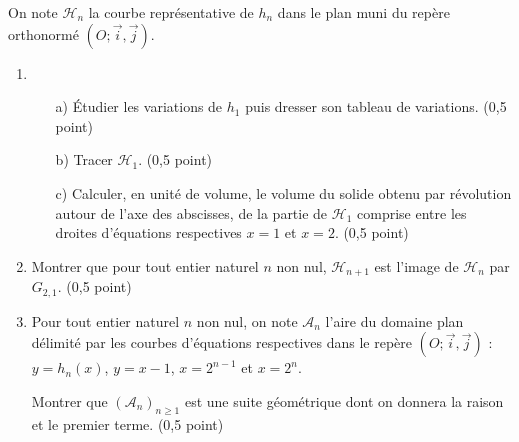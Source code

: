 \documentclass[11pt]{article}
\begin{document}
On note \( \mathcal{H}_n \) la courbe représentative de \( h_n \) dans le plan muni du repère orthonormé \( (O ; \vec{i}, \vec{j}) \).

\begin{enumerate}
    \item
    \begin{enumerate}
        \item[a)] Étudier les variations de \( h_1 \) puis dresser son tableau de variations. \hfill (0,5 point)
        \item[b)] Tracer \( \mathcal{H}_1 \). \hfill (0,5 point)
        \item[c)] Calculer, en unité de volume, le volume du solide obtenu par révolution autour de l’axe des abscisses, de la partie de \( \mathcal{H}_1 \) comprise entre les droites d’équations respectives \( x = 1 \) et \( x = 2 \). \hfill (0,5 point)
    \end{enumerate}

    \item Montrer que pour tout entier naturel \( n \) non nul, \( \mathcal{H}_{n+1} \) est l’image de \( \mathcal{H}_n \) par \( G_{2,1} \). \hfill (0,5 point)

    \item Pour tout entier naturel \( n \) non nul, on note \( \mathcal{A}_n \) l’aire du domaine plan délimité par les courbes d’équations respectives dans le repère \( (O ; \vec{i}, \vec{j}) \) : \( y = h_n(x) \), \( y = x - 1 \), \( x = 2^{n-1} \) et \( x = 2^n \).
    
    Montrer que \( (\mathcal{A}_n)_{n \geq 1} \) est une suite géométrique dont on donnera la raison et le premier terme. \hfill (0,5 point)
\end{enumerate}
\end{document}
